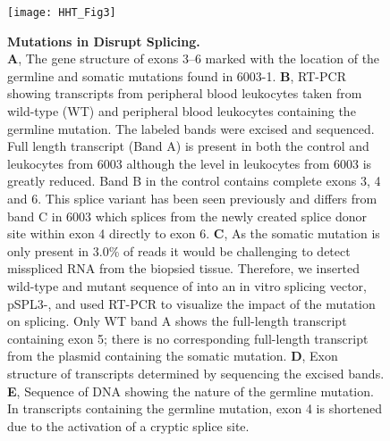 \begin{figure}[tbp!]
\begin{center}
\texttt{[image: HHT\_Fig3]}
\end{center}

\caption[Mutations in  Disrupt Splicing]{\textbf{Mutations in  Disrupt Splicing.} \\ \textbf{A}, The gene structure of  exons 3--6 marked with the location of the germline and somatic mutations found in 6003-1. \textbf{B}, RT-PCR showing  transcripts from peripheral blood leukocytes taken from wild-type (WT) and peripheral blood leukocytes containing the germline mutation. The labeled bands were excised and sequenced. Full length transcript (Band A) is present in both the control and leukocytes from 6003 although the level in leukocytes from 6003 is greatly reduced.  Band B in the control contains complete exons 3, 4 and 6.  This splice variant has been seen previously and differs from band C in 6003 which splices from the newly created splice donor site within exon 4 directly to exon 6. \textbf{C}, As the somatic mutation is only present in 3.0\% of reads it would be challenging to detect misspliced RNA from the biopsied tissue. Therefore, we inserted wild-type and mutant sequence of  into an in vitro splicing vector, pSPL3-, and used RT-PCR to visualize the impact of the mutation on splicing. Only WT band A shows the full-length transcript containing exon 5; there is no corresponding full-length transcript from the plasmid containing the somatic mutation. \textbf{D}, Exon structure of  transcripts determined by sequencing the excised bands. \textbf{E}, Sequence of DNA showing the nature of the germline mutation. In  transcripts containing the germline mutation, exon 4 is shortened due to the activation of a cryptic splice site. }

\label{HHT_Figure_3}
\end{figure}

